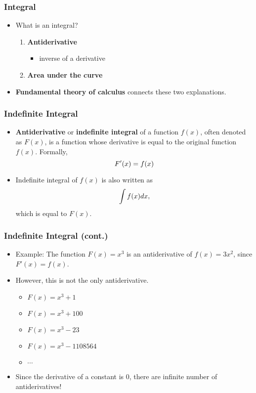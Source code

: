 \documentclass[pdflatex, 12pt]{beamer}
\begin{document}
\begin{frame}
\frametitle{Integral}
\begin{itemize}
\item What is an integral?
 \begin{enumerate}
 \item \textbf{Antiderivative}
  \begin{itemize}
  \item inverse of a derivative
  \end{itemize}
 \item \textbf{Area under the curve}
 \end{enumerate}
\vspace{0.4cm}
\item \textbf{Fundamental theory of calculus} connects these two explanations.
\end{itemize}
\end{frame}

\begin{frame}
\frametitle{Indefinite Integral}
\begin{itemize}
\item \textbf{Antiderivative} or \textbf{indefinite integral} of a function $f(x)$, often denoted as $F(x)$, is a function whose derivative is equal to the original function $f(x)$. Formally,
 \begin{equation}
 F'(x) = f(x) \notag 
 \end{equation} 
\item Indefinite integral of $f(x)$ is also written as 
 \begin{equation}
 \int f(x) dx, \notag 
 \end{equation}
which is equal to $F(x)$. 
\end{itemize}
\end{frame}

\begin{frame}
\frametitle{Indefinite Integral (cont.)}
\begin{itemize}
\item Example: The function $F(x) = x^3$ is an antiderivative of $f(x) = 3x^2$, since $F'(x) = f(x)$.
\vspace{0.4cm}
\item However, this is not the only antiderivative.
 \begin{itemize}
 \item $F(x) = x^3 + 1$
 \item $F(x) = x^3 + 100$
 \item $F(x) = x^3 - 23$
 \item $F(x) = x^3 - 1108564$
 \item $\cdots$
 \end{itemize}
\vspace{0.4cm}
\item Since the derivative of a constant is 0, there are infinite number of antiderivatives!
\end{itemize}	
\end{frame}
\end{document}
